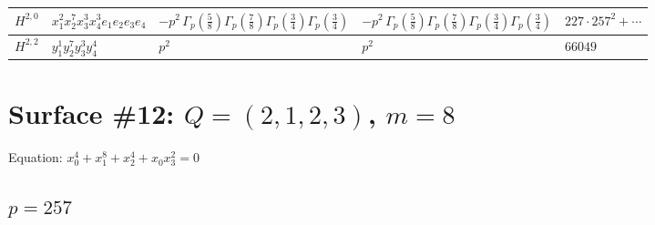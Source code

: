 \documentclass[11pt]{article}
\begin{document}
\begin{table}[ht]
{\begin{tabular}{@{}lllll@{}}
\midrule
$H^{2,0}$ & $x_{1}^{2} x_{2}^{7} x_{3}^{3} x_{4}^{3}  e_{1} e_{2} e_{3} e_{4}$ & $- p^{2} \, \Gamma_p \left( \frac{5}{8} \right) \Gamma_p \left( \frac{7}{8} \right) \Gamma_p \left( \frac{3}{4} \right) \Gamma_p \left( \frac{3}{4} \right)$ & $- p^{2} \, \Gamma_p \left( \frac{5}{8} \right) \Gamma_p \left( \frac{7}{8} \right) \Gamma_p \left( \frac{3}{4} \right) \Gamma_p \left( \frac{3}{4} \right)$ & $227{\cdot}257^{2}{+}\cdots$ \\
\midrule
$H^{2,2}$ & $y_{1}^{1} y_{2}^{7} y_{3}^{3} y_{4}^{4}$ & $p^{2} \,$ & $p^{2} \,$ & $66049$ \\
\bottomrule
\end{tabular}
}
\renewcommand{\arraystretch}{1.0}
\end{table}

\newpage

\section*{Surface \#12: $Q=(2, 1, 2, 3)$, $m=8$}

Equation: $x_0^{4} + x_1^{8} + x_2^{4} + x_0 x_3^{2} = 0$

\subsection*{$p = 257$}
\end{document}

